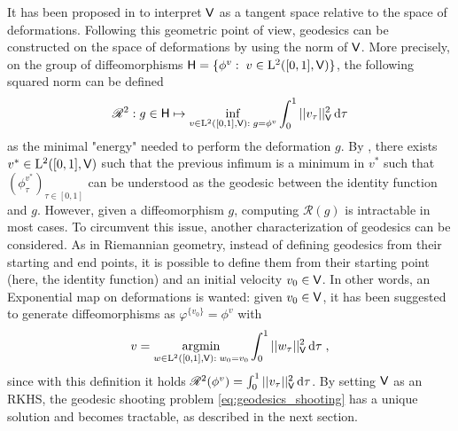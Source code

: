 It has been proposed in \cite{miller2006geodesic} to interpret $\mathsf{V}$ as a tangent space relative to the space of deformations.
Following this geometric point of view, geodesics can be constructed on the space of deformations by using the norm of $\mathsf{V}$. 
More precisely, on the group of diffeomorphisms $\mathsf{H}=\{ \phi^v:\; v\in \mathrm{L}^2([0,1],\mathsf{V})\}$,
 the following squared norm can be defined
 \begin{equation}
  \label{eq:geodesics_original}
    \mathscr{R}^2: g\in \mathsf{H}\mapsto \inf_{ v\in \mathrm{L}^2([0,1],\mathsf{V}):\; g=\phi^v} \int_0^1 || v_\tau||_{\mathsf{V}}^2\mathop{}\!\mathrm{d} \tau
 \end{equation}
     as the minimal "energy" needed to perform the deformation $g$.
By \citep[Theorem 6]{glaunes2005transport}, there exists $v^*\in \mathrm{L}^2([0,1],\mathsf{V})$ such that the previous infimum is a minimum in $v^*$ such that $(\phi^{v^*}_\tau)_{\tau\in[0,1]}$ can be understood as the geodesic between the identity function and $g$.
However, given a diffeomorphism $g$, computing $\mathscr{R}(g)$ is intractable in most cases. 
To circumvent this issue, another characterization of geodesics can be considered.
 As in Riemannian geometry, 
 instead of defining geodesics from their starting and end points, it is possible to define them from their starting point (here, the identity function) and an initial velocity $v_0\in\mathsf{V}$.
 In other words, an Exponential map on deformations is wanted:
given $v_0\in\mathsf{V}$, it has been suggested to generate diffeomorphisms as $\varphi^{\{v_0\}}=\phi^v$ with
 \begin{equation}
  \label{eq:geodesics_shooting}
  v=\underset{w\in \mathrm{L}^2([0,1],\mathsf{V}):\; w_0=v_0}{\operatorname{argmin}} \int_0^1 || w_\tau||_{\mathsf{V}}^2\mathop{}\!\mathrm{d} \tau\; ,
 \end{equation}
since with this definition it holds $\mathscr{R}^2(\phi^v)= \int_0^1 || v_\tau||_{\mathsf{V}}^2\mathop{}\!\mathrm{d} \tau $.
By setting $\mathsf{V}$ as an RKHS, the geodesic shooting problem \eqref{eq:geodesics_shooting} has a unique solution and becomes tractable, as described in the next section.





